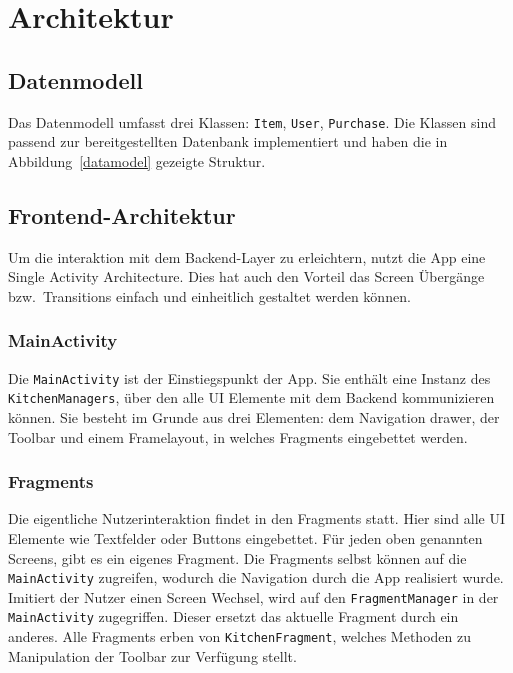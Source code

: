 \section{Architektur}\label{sec:architecture}

\subsection{Datenmodell}\label{subsec:datamodel}

Das Datenmodell umfasst drei Klassen: \texttt{Item}, \texttt{User}, \texttt{Purchase}.
Die Klassen sind passend zur bereitgestellten Datenbank implementiert und haben die in Abbildung~\ref{datamodel} gezeigte Struktur.


\subsection{Frontend-Architektur}\label{subsec:frontend}
Um die interaktion mit dem Backend-Layer zu erleichtern, nutzt die App eine Single Activity Architecture.
Dies hat auch den Vorteil das Screen Übergänge bzw.\ Transitions einfach und einheitlich gestaltet werden können.

\subsubsection{MainActivity}

Die \texttt{MainActivity} ist der Einstiegspunkt der App.
Sie enthält eine Instanz des \texttt{KitchenManagers}, über den alle UI Elemente mit dem Backend kommunizieren können.
Sie besteht im Grunde aus drei Elementen: dem Navigation drawer, der Toolbar und einem Framelayout, in welches Fragments eingebettet werden.

\subsubsection{Fragments}

Die eigentliche Nutzerinteraktion findet in den Fragments statt.
Hier sind alle UI Elemente wie Textfelder oder Buttons eingebettet.
Für jeden oben genannten Screens, gibt es ein eigenes Fragment.
Die Fragments selbst können auf die \texttt{MainActivity} zugreifen, wodurch die Navigation durch die App realisiert wurde.
Imitiert der Nutzer einen Screen Wechsel, wird auf den \texttt{FragmentManager} in der  \texttt{MainActivity} zugegriffen.
Dieser ersetzt das aktuelle Fragment durch ein anderes.
Alle Fragments erben von \texttt{KitchenFragment}, welches Methoden zu Manipulation der Toolbar zur Verfügung stellt.

